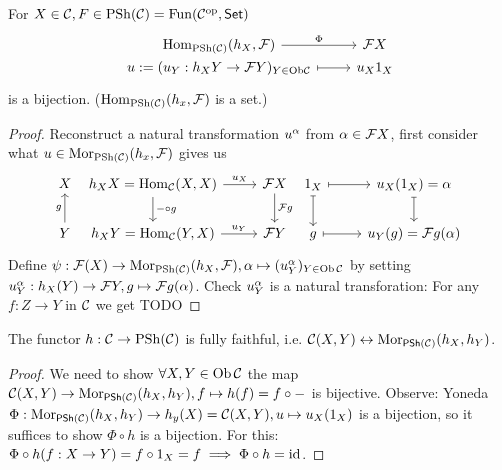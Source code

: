 \documentclass[a4paper]{report}
\begin{document}
\begin{lemm}
  For $X \in \mathcal{C}, F \in \mathrm{PSh}(\mathcal{C}) = \mathrm{Fun}(\mathcal{C}^\mathrm{op}, \mathsf{Set})$
  \[\begin{tikzcd}
{\mathrm{Hom}_{\mathrm{PSh}(\mathcal C)}(h_X, \mathcal F)} \arrow[r, "\Phi"]       & \mathcal F X \\[-20]
u:= (u_Y: h_XY \to \mathcal FY)_{Y \in \mathrm{Ob}\cal C} \arrow[r, maps to] & u_X1_X
\end{tikzcd}\]
is a bijection. ($\operatorname{Hom}_{\mathrm{PSh}(\mathcal{C})}(h_{x}, \mathcal F)$ is a set.)
\begin{proof}
  Reconstruct a natural transformation $u^{\alpha}$ from $\alpha \in \mathcal FX$, first consider what $u \in \operatorname{Mor}_{\mathrm{PSh}(\mathcal{C})}(h_{x}, \mathcal F)$ gives us
  \[\begin{tikzcd}
X                &[-20] {h_X X = \Hom_\C(X,X)} \arrow[r, "u_X"] \arrow[d, "- \circ g"] & \mathcal FX \arrow[d, "\mathcal Fg"] &[-20] 1_X \arrow[d, maps to] \arrow[r, maps to] & u_X(1_X) = \alpha \arrow[d, maps to] \\
Y \arrow[u, "g"] & {h_XY = \Hom_\C(Y,X)} \arrow[r, "u_Y"]                     & \mathcal FY                          & g \arrow[r, maps to]                      & u_Y(g) = \mathcal Fg(\a)
\end{tikzcd}\]
Define $\psi: \mathcal F(X) \to \operatorname{Mor}_{\mathrm{PSh}(\mathcal{C})}(h_{X}, \mathcal F), \alpha \mapsto (u_{Y}^{\alpha})_{Y \in \operatorname{Ob} \mathcal{C}}$ by setting $u_{Y}^{\alpha}: h_{X}(Y) \to \mathcal FY, g \mapsto \mathcal Fg(\alpha)$. Check $u_{Y}^{\alpha}$ is a natural transforation: For any $f: Z \to Y$ in $\mathcal{C}$ we get TODO
\end{proof}
\end{lemm}

\begin{cor}The functor $h : \mathcal{C} \to \mathrm{PSh}(\mathcal{C})$ is fully faithful, i.e. $\mathcal{C}(X,Y) \leftrightarrow \operatorname{Mor}_{\mathsf{PSh} (\mathcal{C})}(h_{X},h_{Y})$.
\begin{proof}
We need to show $\forall X, Y \in \operatorname{Ob} \mathcal{C}$ the map $\mathcal{C}(X,Y) \to \operatorname{Mor}_{\mathsf{PSh}(\mathcal{C})}(h_{X}, h_{Y}), f \mapsto h(f) = f \circ -$ is bijective. Observe: Yoneda $\Phi: \operatorname{Mor}_{\mathsf{PSh}(\mathcal{C})}(h_{X},h_{Y}) \to h_{y}(X) = \mathcal{C}(X,Y), u \mapsto u_{X}(1_{X})$ is a bijection, so it suffices to show $\Phi \circ h$ is a bijection. For this: $\Phi \circ h(f: X \to Y) = f \circ 1_{X} = f \implies \Phi \circ h = \operatorname{id}$.
\end{proof}
\end{cor}
\end{document}
